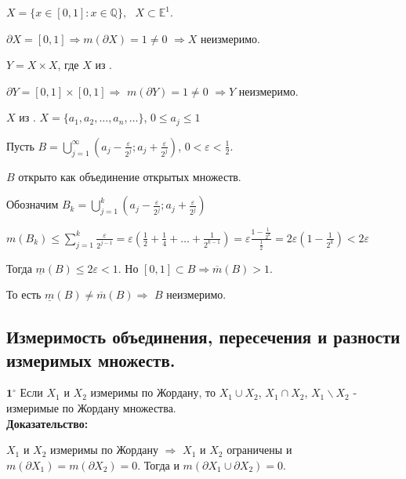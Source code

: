 \documentclass[a4paper,12pt]{article} %
\begin{document}
 $X = \{x \in [0, 1]: x \in \mathbb{Q}\}, \text{ }X \subset \mathbb{E}^1$.

$\partial X = [0,1] \Rightarrow m(\partial X) = 1 \neq 0$ $\Rightarrow X$ неизмеримо.

\vspace{5mm}
 $Y = X\times X$, где $X$ из .

$\partial Y = [0,1]\times [0,1] \Rightarrow$ $m(\partial Y) = 1 \neq 0$ $\Rightarrow Y$ неизмеримо.

\vspace{5mm}
 $X$ из . $X = \{a_1, a_2, \ldots, a_n, \ldots\}$, $0 \leqslant a_j \leqslant 1$

Пусть $B = \bigcup\limits_{j = 1}^{\infty} \left(a_j - \frac{\varepsilon}{2^j}; a_j + \frac{\varepsilon}{2^j}\right)$, $0 < \varepsilon < \frac{1}{2}$.

$B$ открыто как объединение открытых множеств.

Обозначим $B_k = \bigcup\limits_{j = 1}^k \left(a_j - \frac{\varepsilon}{2^j}; a_j + \frac{\varepsilon}{2^j}\right)$


$m(B_k) \leqslant \sum\limits_{j = 1}^k \frac{\varepsilon}{2^{j-1}} = \varepsilon \left(\frac{1}{2} + \frac{1}{4} + \ldots + \frac{1}{2^{k-1}}\right) = \varepsilon \frac{1 - \frac{1}{2^k}}{\frac{1}{2}} = 2\varepsilon \left(1 - \frac{1}{2^k}\right) < 2\varepsilon$

Тогда $\underline{m}(B) \leqslant 2\varepsilon < 1$. Но $[0, 1]\subset B \Rightarrow \overline{m}(B) > 1$.

То есть $\underline{m}(B) \neq \overline{m}(B) \Rightarrow$  $B$ неизмеримо.\\

\subsection{Измеримость объединения, пересечения и разности измеримых множеств.}

$\textbf{1}^\circ$ Если $X_1$ и $X_2$ измеримы по Жордану, то $X_1 \cup X_2$, $X_1 \cap X_2$, $X_1 \backslash X_2$ - измеримые по Жордану множества.\\

\textbf{Доказательство:}

$X_1$ и $X_2$ измеримы по Жордану $\Rightarrow$ $X_1$ и $X_2$ ограничены и $m(\partial X_1) = m(\partial X_2) = 0$. Тогда и $m(\partial X_1 \cup \partial X_2) = 0$.
\vspace{3mm}
\end{document}
